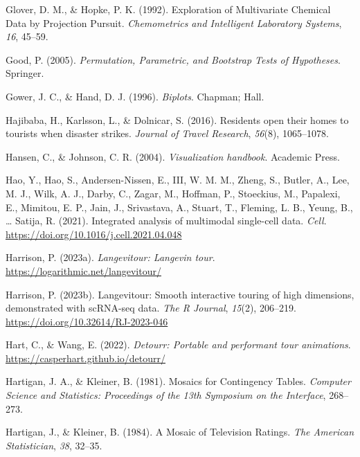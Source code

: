 \documentclass[
  letterpaper,
]{krantz}
\newlength{\cslhangindent}
\newenvironment{CSLReferences}[2] %
 {\begin{list}{}{%
  \setlength{\itemindent}{0pt}
  \setlength{\leftmargin}{0pt}
  \setlength{\parsep}{0pt}
  \ifodd #1
   \setlength{\leftmargin}{\cslhangindent}
   \setlength{\itemindent}{-1\cslhangindent}
  \fi
  \setlength{\itemsep}{#2\baselineskip}}}
 {\end{list}}
\begin{document}
\begin{CSLReferences}{1}{0}
Glover, D. M., \& Hopke, P. K. (1992). {E}xploration of {M}ultivariate
{C}hemical {D}ata by {P}rojection {P}ursuit. \emph{Chemometrics and
Intelligent Laboratory Systems}, \emph{16}, 45--59.

Good, P. (2005). \emph{Permutation, {P}arametric, and {B}ootstrap
{T}ests of {H}ypotheses}. Springer.

Gower, J. C., \& Hand, D. J. (1996). \emph{Biplots}. Chapman; Hall.

Hajibaba, H., Karlsson, L., \& Dolnicar, S. (2016). Residents open their
homes to tourists when disaster strikes. \emph{Journal of Travel
Research}, \emph{56}(8), 1065--1078.

Hansen, C., \& Johnson, C. R. (2004). \emph{Visualization handbook}.
Academic Press.

Hao, Y., Hao, S., Andersen-Nissen, E., III, W. M. M., Zheng, S., Butler,
A., Lee, M. J., Wilk, A. J., Darby, C., Zagar, M., Hoffman, P.,
Stoeckius, M., Papalexi, E., Mimitou, E. P., Jain, J., Srivastava, A.,
Stuart, T., Fleming, L. B., Yeung, B., \ldots{} Satija, R. (2021).
Integrated analysis of multimodal single-cell data. \emph{Cell}.
\url{https://doi.org/10.1016/j.cell.2021.04.048}

Harrison, P. (2023a). \emph{Langevitour: Langevin tour}.
\url{https://logarithmic.net/langevitour/}

Harrison, P. (2023b). Langevitour: Smooth interactive touring of high
dimensions, demonstrated with scRNA-seq data. \emph{The R Journal},
\emph{15}(2), 206--219. \url{https://doi.org/10.32614/RJ-2023-046}

Hart, C., \& Wang, E. (2022). \emph{Detourr: Portable and performant
tour animations}. \url{https://casperhart.github.io/detourr/}

Hartigan, J. A., \& Kleiner, B. (1981). Mosaics for {C}ontingency
{T}ables. \emph{Computer Science and Statistics: Proceedings of the 13th
Symposium on the Interface}, 268--273.

Hartigan, J., \& Kleiner, B. (1984). A {M}osaic of {T}elevision
{R}atings. \emph{The American Statistician}, \emph{38}, 32--35.


\end{CSLReferences}
\end{document}

